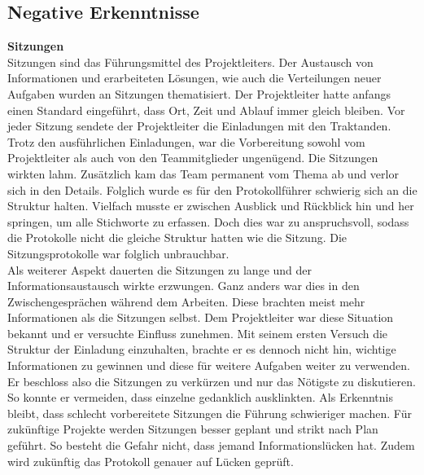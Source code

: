 \subsection{Negative Erkenntnisse}
\textbf{Sitzungen}\\
Sitzungen sind das Führungsmittel des Projektleiters. Der Austausch von Informationen und erarbeiteten Lösungen, wie auch die Verteilungen neuer Aufgaben wurden an Sitzungen thematisiert. Der Projektleiter hatte anfangs einen Standard eingeführt, dass Ort, Zeit und Ablauf immer gleich bleiben. Vor jeder Sitzung sendete der Projektleiter die Einladungen mit den Traktanden. Trotz den ausführlichen Einladungen, war die Vorbereitung sowohl vom Projektleiter als auch von den Teammitglieder ungenügend. Die Sitzungen wirkten lahm. Zusätzlich kam das Team permanent vom Thema ab und verlor sich in den Details. Folglich wurde es für den Protokollführer schwierig sich an die Struktur halten. Vielfach musste er zwischen Ausblick und Rückblick hin und her springen, um alle Stichworte zu erfassen. Doch dies war zu anspruchsvoll, sodass die Protokolle nicht die gleiche Struktur hatten wie die Sitzung. Die Sitzungsprotokolle war folglich unbrauchbar.\\
Als weiterer Aspekt dauerten die Sitzungen  zu lange und der Informationsaustausch wirkte erzwungen. Ganz anders war dies in den Zwischengesprächen während dem Arbeiten. Diese brachten meist mehr Informationen als die Sitzungen selbst. Dem Projektleiter war diese Situation bekannt und er versuchte Einfluss zunehmen. Mit seinem ersten Versuch die Struktur der Einladung einzuhalten, brachte er es dennoch nicht hin, wichtige Informationen zu gewinnen und diese für weitere Aufgaben weiter zu verwenden. Er beschloss also die Sitzungen zu verkürzen und nur das Nötigste zu diskutieren. So konnte er vermeiden, dass einzelne gedanklich ausklinkten. 
Als Erkenntnis bleibt, dass schlecht vorbereitete Sitzungen die Führung schwieriger machen. Für zukünftige Projekte werden Sitzungen besser geplant und strikt nach Plan geführt. So besteht die Gefahr nicht, dass jemand Informationslücken hat. Zudem wird zukünftig das Protokoll genauer auf Lücken geprüft.\\

